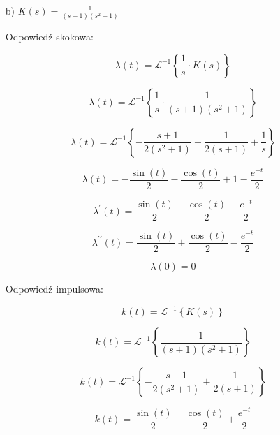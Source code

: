 \documentclass{article}
\begin{document}
\begin{enumerate}
    
    
    
    
    \item[b)]  $K(s)=\frac{1}{\left(s + 1\right) \left(s^{2} + 1\right)}$

    Odpowiedź skokowa:

    $$ \lambda(t)=\mathcal{L}^{-1}\left\{\frac{1}{s}\cdot K(s)\right\} $$

    $$ \lambda(t)=\mathcal{L}^{-1}\left\{\frac{1}{s}\cdot \frac{1}{\left(s + 1\right) \left(s^{2} + 1\right)}\right\} $$

    $$ \lambda(t)= \mathcal{L}^{-1}\left\{- \frac{s + 1}{2 \left(s^{2} + 1\right)} - \frac{1}{2 \left(s + 1\right)} + \frac{1}{s}
    \right\}$$

    $$ \lambda(t)=- \frac{\sin{\left(t \right)}}{2} - \frac{\cos{\left(t \right)}}{2} + 1 - \frac{e^{- t}}{2} $$

    $$ \lambda^{\prime}(t)=\frac{\sin{\left(t \right)}}{2} - \frac{\cos{\left(t \right)}}{2} + \frac{e^{- t}}{2}$$

    $$ \lambda^{\prime\prime}(t)=\frac{\sin{\left(t \right)}}{2} + \frac{\cos{\left(t \right)}}{2} - \frac{e^{- t}}{2}$$

    $$ \lambda(0)= 0 $$

    \newpage















    Odpowiedź impulsowa:

    $$ k(t)=\mathcal{L}^{-1}\left\{K(s)\right\} $$

    $$ k(t)=\mathcal{L}^{-1}\left\{\frac{1}{\left(s + 1\right) \left(s^{2} + 1\right)}\right\} $$

    $$ k(t)=\mathcal{L}^{-1}\left\{- \frac{s - 1}{2 \left(s^{2} + 1\right)} + \frac{1}{2 \left(s + 1\right)}\right\} $$

    $$ k(t)=\frac{\sin{\left(t \right)}}{2} - \frac{\cos{\left(t \right)}}{2} + \frac{e^{- t}}{2}$$


    
    \newpage



















\end{enumerate}
\end{document}
